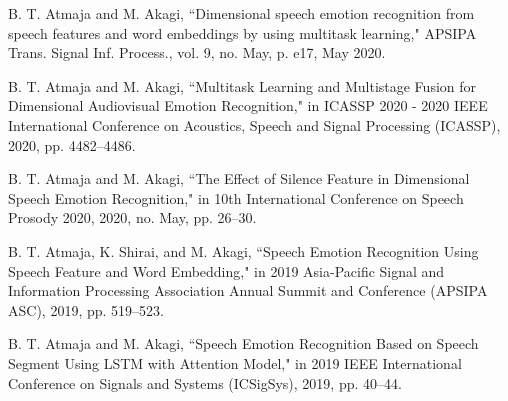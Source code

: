 \begin{publication}

\item 
B. T. Atmaja and M. Akagi, ``Dimensional speech emotion recognition from speech features and word embeddings by using multitask learning," APSIPA Trans. Signal Inf. Process., vol. 9, no. May, p. e17, May 2020.

\item
B. T. Atmaja and M. Akagi, ``Multitask Learning and Multistage Fusion for Dimensional Audiovisual Emotion Recognition," in ICASSP 2020 - 2020 IEEE International Conference on Acoustics, Speech and Signal Processing (ICASSP), 2020, pp. 4482--4486.

\item
B. T. Atmaja and M. Akagi, ``The Effect of Silence Feature in Dimensional Speech Emotion Recognition," in 10th International Conference on Speech Prosody 2020, 2020, no. May, pp. 26--30.

\item 
B. T. Atmaja, K. Shirai, and M. Akagi, ``Speech Emotion Recognition Using Speech Feature and Word Embedding," in 2019 Asia-Pacific Signal and Information Processing Association Annual Summit and Conference (APSIPA ASC), 2019, pp. 519--523.

\item
B. T. Atmaja and M. Akagi, ``Speech Emotion Recognition Based on Speech Segment
Using LSTM with Attention Model," in 2019 IEEE International Conference on
Signals and Systems (ICSigSys), 2019, pp. 40--44.

\end{publication}
